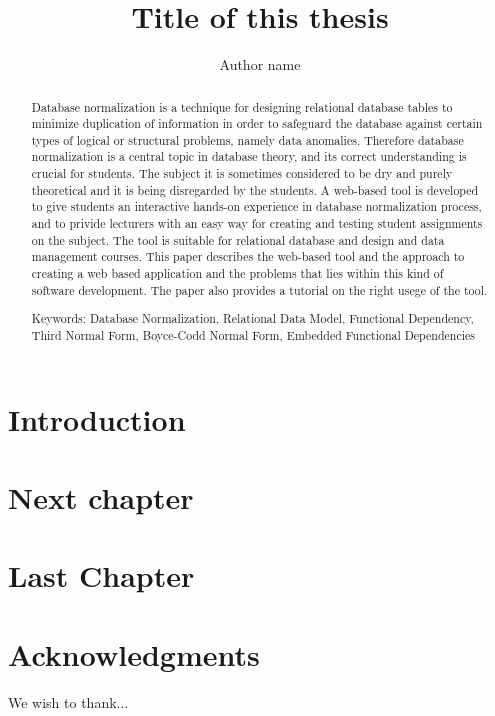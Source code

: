 \documentclass[a4paper,11pt,twoside]{report}
\title{Title of this thesis}
\author{Author name}
\begin{document}

\maketitle

\begin{abstract}

Database normalization is a technique for designing relational database tables to minimize
duplication of information in order to safeguard the database against certain types of logical or
structural problems, namely data anomalies. Therefore database normalization is a central topic in
database theory, and its correct understanding is crucial for students. The subject it is sometimes considered to be
dry and purely theoretical and it is being disregarded by the students. A web-based tool is developed to give students an interactive hands-on experience in database normalization process, and to privide lecturers with an easy way for creating and testing student assignments on the subject.  The tool is suitable for relational database and design and data management courses. This paper describes the web-based tool and the approach to creating a web based application and the problems that
lies within this kind of software development. The paper also provides a tutorial on the right usege of the tool.   


Keywords: Database Normalization, Relational Data Model, Functional Dependency, Third Normal Form, Boyce-Codd Normal Form, Embedded Functional Dependencies
\end{abstract}

\cleardoublepage

\tableofcontents
 
\cleardoublepage

\listoffigures
 
\cleardoublepage
{}
\setcounter{page}{1}
 
\chapter{Introduction}

\chapter{Next chapter}

\chapter{Last Chapter}
 
\cleardoublepage
{}
\chapter*{Acknowledgments}

We wish to thank...

\cleardoublepage
{}


 
\end{document}
